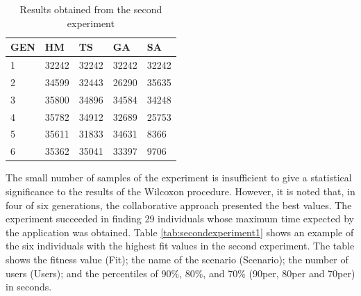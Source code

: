 \documentclass[conference]{IEEEtran}
\begin{document}
\begin{table}[h]
\centering
\caption{Results obtained from the second experiment}
\label{tab:secondexperiment}
\begin{tabular}{|l|l|l|l|l|}
\hline
GEN & HM    & TS    & GA    & SA    \\
\hline
1          & 32242 & 32242 & 32242 & 32242 \\
\hline
2          & 34599 & 32443 & 26290 & 35635 \\
\hline
3          & 35800 & 34896 & 34584 & 34248 \\
\hline
4          & 35782 & 34912 & 32689 & 25753 \\
\hline
5          & 35611 & 31833 & 34631 & 8366  \\
\hline
6          & 35362 & 35041 & 33397 & 9706 \\
\hline
\end{tabular}
\end{table}


The small number of samples of the experiment is insufficient to give a statistical significance to the results of the Wilcoxon procedure. However, it is noted that, in four of six generations, the collaborative approach presented the best values. The experiment succeeded in finding 29 individuals whose maximum time expected by the application was obtained.  Table \ref{tab:secondexperiment1} shows an example of the six individuals with the highest fit values in the second experiment. The table shows the fitness value (Fit);  the name of the scenario (Scenario); the number of users (Users); and the percentiles of 90\%, 80\%, and 70\% (90per, 80per and 70per) in seconds.  
\end{document}
